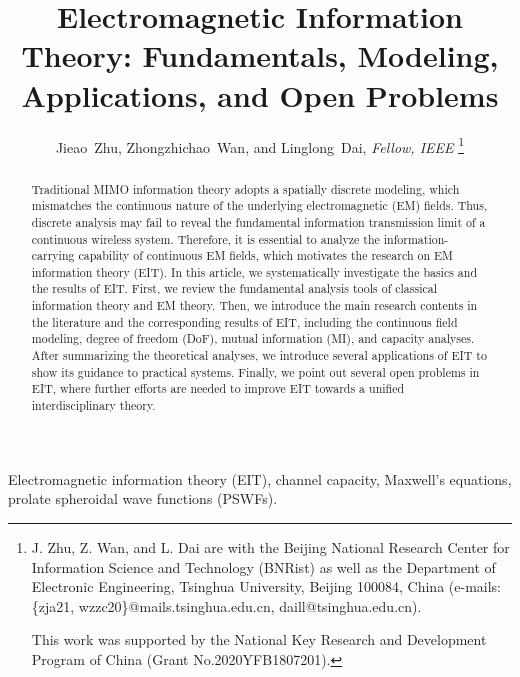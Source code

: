 \documentclass[journal,twocolumn]{IEEEtran}
\begin{document}
\title{Electromagnetic Information Theory: Fundamentals, Modeling, Applications, and Open Problems}

\author{{Jieao~Zhu, Zhongzhichao~Wan, and Linglong~Dai, {\textit{Fellow, IEEE}}}
\thanks{J. Zhu, Z. Wan, and L. Dai are with the Beijing National Research Center for Information Science and Technology (BNRist) as well as the Department of Electronic Engineering, Tsinghua University, Beijing 100084, China (e-mails: \{zja21, wzzc20\}@mails.tsinghua.edu.cn, daill@tsinghua.edu.cn).

This work was supported by the National Key Research and Development Program of China (Grant No.2020YFB1807201). }
}

\maketitle

\begin{abstract}
	Traditional MIMO information theory adopts a spatially discrete modeling, which mismatches the continuous nature of the underlying electromagnetic (EM) fields.
	Thus, discrete analysis may fail to reveal the fundamental information transmission limit of a continuous wireless system.    
 	Therefore, it is essential to analyze the information-carrying capability of continuous EM fields, which motivates the research on EM information theory (EIT). In this article, we systematically investigate the basics and the results of EIT. First, we review the fundamental analysis tools of classical information theory and EM theory. Then, we introduce the main research contents in the literature and the corresponding results of EIT, including the continuous field modeling, degree of freedom (DoF), mutual information (MI), and capacity analyses. After summarizing the theoretical analyses, we introduce several applications of EIT to show its guidance to practical systems. Finally, we point out several open problems in EIT, where further efforts are needed to improve EIT towards a unified interdisciplinary theory.
\end{abstract}

\begin{IEEEkeywords}
    Electromagnetic information theory (EIT), channel capacity, Maxwell's equations, prolate spheroidal wave functions (PSWFs). 
\end{IEEEkeywords}
\end{document}
